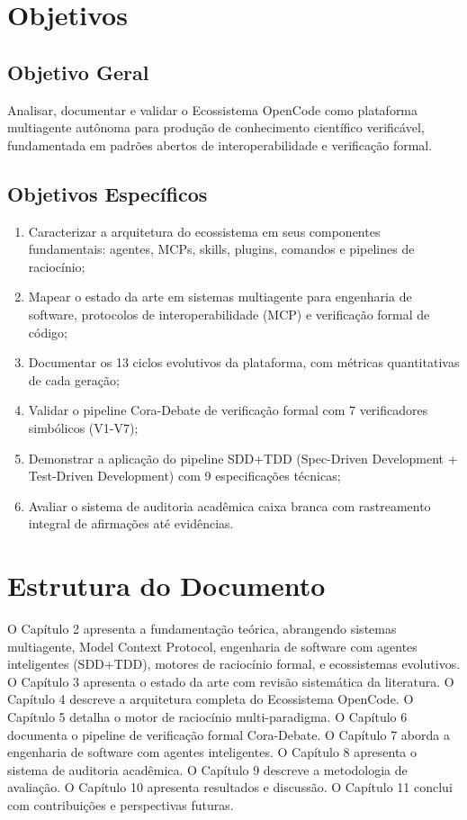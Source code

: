 \documentclass[12pt,a4paper,sumario=tradicional]{abntex2}
\begin{document}
\section{Objetivos}

\subsection{Objetivo Geral}

Analisar, documentar e validar o Ecossistema OpenCode como plataforma multiagente autônoma para produção de conhecimento científico verificável, fundamentada em padrões abertos de interoperabilidade e verificação formal.

\subsection{Objetivos Específicos}

\begin{enumerate}
    \item Caracterizar a arquitetura do ecossistema em seus componentes fundamentais: agentes, MCPs, skills, plugins, comandos e pipelines de raciocínio;
    \item Mapear o estado da arte em sistemas multiagente para engenharia de software, protocolos de interoperabilidade (MCP) e verificação formal de código;
    \item Documentar os 13 ciclos evolutivos da plataforma, com métricas quantitativas de cada geração;
    \item Validar o pipeline Cora-Debate de verificação formal com 7 verificadores simbólicos (V1-V7);
    \item Demonstrar a aplicação do pipeline SDD+TDD (Spec-Driven Development + Test-Driven Development) com 9 especificações técnicas;
    \item Avaliar o sistema de auditoria acadêmica caixa branca com rastreamento integral de afirmações até evidências.
\end{enumerate}

\section{Estrutura do Documento}

O Capítulo 2 apresenta a fundamentação teórica, abrangendo sistemas multiagente, Model Context Protocol, engenharia de software com agentes inteligentes (SDD+TDD), motores de raciocínio formal, e ecossistemas evolutivos. O Capítulo 3 apresenta o estado da arte com revisão sistemática da literatura. O Capítulo 4 descreve a arquitetura completa do Ecossistema OpenCode. O Capítulo 5 detalha o motor de raciocínio multi-paradigma. O Capítulo 6 documenta o pipeline de verificação formal Cora-Debate. O Capítulo 7 aborda a engenharia de software com agentes inteligentes. O Capítulo 8 apresenta o sistema de auditoria acadêmica. O Capítulo 9 descreve a metodologia de avaliação. O Capítulo 10 apresenta resultados e discussão. O Capítulo 11 conclui com contribuições e perspectivas futuras.
\end{document}
